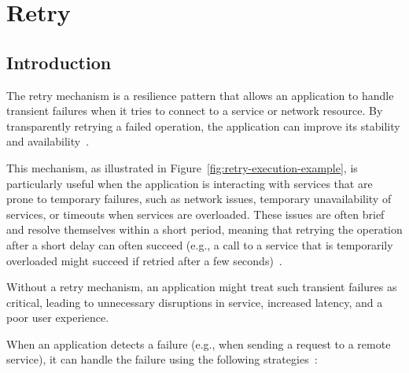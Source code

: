 \chapter{Retry}\label{ch:retry}


\section{Introduction}\label{sec:retry-context}

The retry mechanism is a resilience pattern that allows an application to handle transient failures when it tries to connect to a service or network resource.
By transparently retrying a failed operation, the application can improve its stability and availability~\cite{microsoft-retry-pattern}.

This mechanism, as illustrated in Figure~\ref{fig:retry-execution-example}, is particularly useful when the application is interacting with services that are prone to temporary failures, such as network issues, temporary unavailability of services, or timeouts when services are overloaded.
These issues are often brief and resolve themselves within a short period, meaning that retrying the operation after a short delay can often succeed (e.g., a call to a service that is temporarily overloaded might succeed if retried after a few seconds)~\cite{microsoft-retry-pattern}.

Without a retry mechanism, an application might treat such transient failures as critical,
leading to unnecessary disruptions in service, increased latency, and a poor user experience.

When an application detects a failure (e.g., when sending a request to a remote service), it can handle the failure using the following strategies~\cite{microsoft-retry-pattern}:

